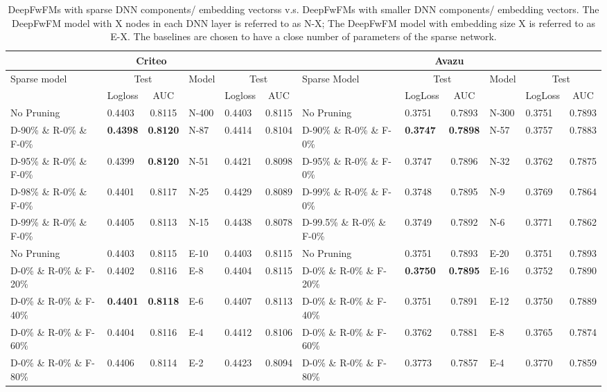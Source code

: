 \documentclass[sigconf]{acmart}
\begin{document}
\begin{table*}
 \caption{DeepFwFMs with sparse DNN components/ embedding vectorss v.s. DeepFwFMs with smaller DNN components/ embedding vectors. The DeepFwFM model with X nodes in each DNN layer is referred to as N-X; The DeepFwFM model with embedding size X is referred to as E-X. The baselines are chosen to have a close number of parameters of the sparse network.}
  \centering
  \small
  \begin{tabular}{llc|llc||llc|llc}
    \toprule
    \multicolumn{6}{c||}{Criteo} & \multicolumn{6}{c}{Avazu} \\
    \midrule
    \multirow{2}{*}{Sparse model}  & \multicolumn{2}{c|}{Test} & \multirow{2}{*}{Model} & \multicolumn{2}{c||}{Test} & \multirow{2}{*}{Sparse Model}  & \multicolumn{2}{c|}{Test} & \multirow{2}{*}{Model} & \multicolumn{2}{c}{Test} \\
     & Logloss     & AUC & &  Logloss     & AUC &  & LogLoss     & AUC & &  LogLoss     & AUC\\
    \midrule
    No Pruning   &  0.4403  & 0.8115 & N-400 & 0.4403 & 0.8115 &  No Pruning &   0.3751 & 0.7893   & N-300 &   0.3751 & 0.7893   \\
    \midrule
     D-90\% \& R-0\% \& F-0\%  &  \textbf{0.4398}  & \textbf{{0.8120}}  & N-87 & 0.4414 & 0.8104 & D-90\% \& R-0\% \& F-0\% &  \textbf{0.3747} & \textbf{0.7898}  & N-57 &   0.3757 & 0.7883  \\
     D-95\% \& R-0\% \& F-0\%  &  0.4399  & \textbf{{0.8120}}  & N-51 & 0.4421 & 0.8098 & D-95\% \& R-0\% \& F-0\% &  0.3747 & 0.7896  & N-32 &   0.3762 & 0.7875  \\
     D-98\% \& R-0\% \& F-0\% &  0.4401  & 0.8117  & N-25 &  0.4429 & 0.8089  & D-99\% \& R-0\% \& F-0\% &  0.3748 & 0.7895  & N-9 &  0.3769 & 0.7864   \\
     D-99\% \& R-0\% \& F-0\% &  0.4405  & 0.8113 & N-15 & 0.4438 & 0.8078 & D-99.5\% \& R-0\% \& F-0\% &  0.3749 & 0.7892 & N-6 &   0.3771 & 0.7862   \\
    \bottomrule
    \midrule
    No Pruning   &  0.4403  & 0.8115 & E-10 & 0.4403  & 0.8115 & No Pruning   &  0.3751 & 0.7893  & E-20 &  0.3751 & 0.7893   \\
    \midrule
     D-0\% \& R-0\% \& F-20\%  &   0.4402 & 0.8116   & E-8 & 0.4404 & 0.8115 &  D-0\% \& R-0\% \& F-20\% &  \textbf{0.3750} & \textbf{0.7895} & E-16 & 0.3752 & 0.7890    \\
     D-0\% \& R-0\% \& F-40\%  & \textbf{0.4401}  &  \textbf{{0.8118}} & E-6  & 0.4407 & 0.8113 & D-0\% \& R-0\% \& F-40\% & 0.3751 & 0.7891 & E-12 & 0.3750 & 0.7889  \\
     D-0\% \& R-0\% \& F-60\%  &  0.4404  & 0.8116  & E-4 & 0.4412 & 0.8106 &  D-0\% \& R-0\% \& F-60\% & 0.3762 & 0.7881 &  E-8 &   0.3765 & 0.7874  \\
     D-0\% \& R-0\% \& F-80\%  &  0.4406  & 0.8114  & E-2 & 0.4423 & 0.8094 &  D-0\% \& R-0\% \& F-80\% & 0.3773 & 0.7857 &  E-4 &   0.3770 & 0.7859  \\
    \bottomrule
  \end{tabular}
  \label{prune_deep}
  \vspace{1em}
\end{table*}
\end{document}
